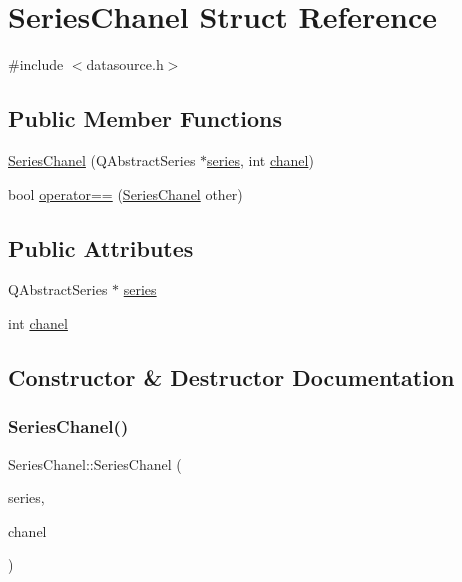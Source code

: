 \hypertarget{struct_series_chanel}{}\section{Series\+Chanel Struct Reference}
\label{struct_series_chanel}


{\ttfamily \#include $<$datasource.\+h$>$}

\subsection*{Public Member Functions}
\begin{DoxyCompactItemize}
\item 
\hyperlink{struct_series_chanel_aa9acfa3be048a0729de56b4373df478a}{Series\+Chanel} (Q\+Abstract\+Series $\ast$\hyperlink{struct_series_chanel_a3cb05afb46b3d15a4896b9a534e6a9dc}{series}, int \hyperlink{struct_series_chanel_aa8765a5a77663bd414058b73f922265f}{chanel})
\item 
bool \hyperlink{struct_series_chanel_a48df63740dd69cd7e34b4f96e1015003}{operator==} (\hyperlink{struct_series_chanel}{Series\+Chanel} other)
\end{DoxyCompactItemize}
\subsection*{Public Attributes}
\begin{DoxyCompactItemize}
\item 
Q\+Abstract\+Series $\ast$ \hyperlink{struct_series_chanel_a3cb05afb46b3d15a4896b9a534e6a9dc}{series}
\item 
int \hyperlink{struct_series_chanel_aa8765a5a77663bd414058b73f922265f}{chanel}
\end{DoxyCompactItemize}


\subsection{Constructor \& Destructor Documentation}
\hypertarget{struct_series_chanel_aa9acfa3be048a0729de56b4373df478a}{}\label{struct_series_chanel_aa9acfa3be048a0729de56b4373df478a} 
\subsubsection{\texorpdfstring{Series\+Chanel()}{SeriesChanel()}}
{\footnotesize\ttfamily Series\+Chanel\+::\+Series\+Chanel (\begin{DoxyParamCaption}\item[{Q\+Abstract\+Series $\ast$}]{series,  }\item[{int}]{chanel }\end{DoxyParamCaption})\hspace{0.3cm}{\ttfamily [inline]}}



